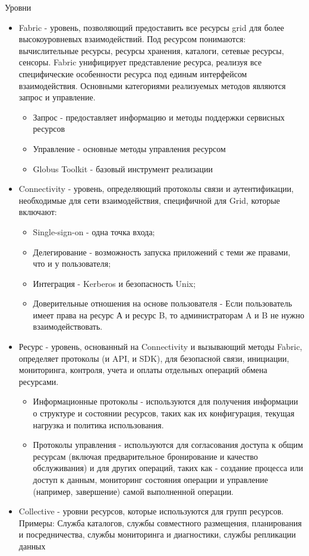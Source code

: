 Уровни
\begin{itemize}
    \item Fabric - уровень, позволяющий предоставить все ресурсы grid для более
    высокоуровневых взаимодействий. Под ресурсом понимаются: вычислительные
    ресурсы, ресурсы хранения, каталоги, сетевые ресурсы, сенсоры. Fabric унифицирует
    представление ресурса, реализуя все специфические особенности ресурса под единым
    интерфейсом взаимодействия. Основными категориями реализуемых методов
    являются запрос и управление.
    \begin{itemize}
        \item Запрос - предоставляет информацию и методы поддержки сервисных ресурсов
        \item Управление - основные методы управления ресурсом
        \item Globus Toolkit - базовый инструмент реализации
    \end{itemize}

    \item Connectivity - уровень, определяющий протоколы связи и аутентификации,
    необходимые для сети взаимодействия, специфичной для Grid, которые
    включают:
    \begin{itemize}
        \item Single-sign-on - одна точка входа;
        \item Делегирование - возможность запуска приложений с теми же правами,
        что и у пользователя;
        \item Интеграция - Kerberos и безопасность Unix;
        \item Доверительные отношения на основе пользователя - Если пользователь
        имеет права на ресурс А и ресурс B, то администраторам A и B не нужно
        взаимодействовать.
    \end{itemize}
    
    \item Ресурс - уровень, основанный на Connectivity и вызывающий методы Fabric,
    определяет протоколы (и API, и SDK), для безопасной связи, инициации, мониторинга,
    контроля, учета и оплаты отдельных операций обмена ресурсами.
    \begin{itemize}
        \item Информационные протоколы - используются для получения информации о структуре
        и состоянии
        ресурсов, таких как их конфигурация, текущая нагрузка и политика использования.
        \item Протоколы управления - используются для согласования доступа к общим ресурсам
        (включая предварительное бронирование и качество обслуживания) и для других
        операций, таких как - создание процесса или доступ к данным, мониторинг состояния
        операции и управление (например, завершение) самой выполненной операции.
    \end{itemize}

    \item Collective - уровни ресурсов, которые используются для групп ресурсов. Примеры:
    Служба каталогов, службы совместного
    размещения, планирования и посредничества, службы мониторинга и
    диагностики, службы репликации данных
\end{itemize}

